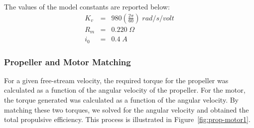 \documentclass[11pt]{article}
\begin{document}
The values of the model constants are reported below:
\begin{eqnarray*}
K_v &=& 980 \left( \frac{2 \pi}{60} \right) \; rad/s/volt \\
R_m &=& 0.220 \; \Omega \\
i_0 &=& 0.4 \; A
\end{eqnarray*}

\subsubsection{Propeller and Motor Matching}
For a given free-stream velocity, the required torque for the propeller was calculated as a function of the angular velocity of the propeller. For the motor, the torque generated was calculated as a function of the angular velocity. By matching these two torques, we solved for the angular velocity and obtained the total propulsive efficiency. This process is illustrated in Figure~\ref{fig:prop-motor1}.
\end{document}
